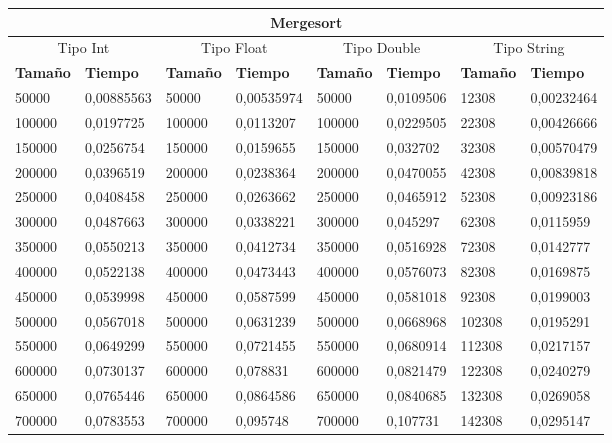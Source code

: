 \documentclass[11pt]{article}
\begin{document}
\begin{table}[!ht]
    \centering
    \small
    \begin{tabular}{|l|l|l|l|l|l|l|l|}
    \hline
    \multicolumn{8}{|c|}{\cellcolor{blue!20}\textbf{Mergesort}} \\ \hline
    \multicolumn{2}{|c|}{\cellcolor{gray!20}Tipo Int} & \multicolumn{2}{c|}{\cellcolor{gray!20}Tipo Float} & \multicolumn{2}{c|}{\cellcolor{gray!20}Tipo Double} & \multicolumn{2}{c|}{\cellcolor{gray!20}Tipo String}\\ \hline
        \textbf{Tamaño} & \textbf{Tiempo} & \textbf{Tamaño} & \textbf{Tiempo} & \textbf{Tamaño} & \textbf{Tiempo} & \textbf{Tamaño} & \textbf{Tiempo} \\ \hline
        50000 & 0,00885563 & 50000 & 0,00535974 & 50000 & 0,0109506 & 12308 & 0,00232464 \\ \hline
        100000 & 0,0197725 & 100000 & 0,0113207 & 100000 & 0,0229505 & 22308 & 0,00426666 \\ \hline
        150000 & 0,0256754 & 150000 & 0,0159655 & 150000 & 0,032702 & 32308 & 0,00570479 \\ \hline
        200000 & 0,0396519 & 200000 & 0,0238364 & 200000 & 0,0470055 & 42308 & 0,00839818 \\ \hline
        250000 & 0,0408458 & 250000 & 0,0263662 & 250000 & 0,0465912 & 52308 & 0,00923186 \\ \hline
        300000 & 0,0487663 & 300000 & 0,0338221 & 300000 & 0,045297 & 62308 & 0,0115959 \\ \hline
        350000 & 0,0550213 & 350000 & 0,0412734 & 350000 & 0,0516928 & 72308 & 0,0142777 \\ \hline
        400000 & 0,0522138 & 400000 & 0,0473443 & 400000 & 0,0576073 & 82308 & 0,0169875 \\ \hline
        450000 & 0,0539998 & 450000 & 0,0587599 & 450000 & 0,0581018 & 92308 & 0,0199003 \\ \hline
        500000 & 0,0567018 & 500000 & 0,0631239 & 500000 & 0,0668968 & 102308 & 0,0195291 \\ \hline
        550000 & 0,0649299 & 550000 & 0,0721455 & 550000 & 0,0680914 & 112308 & 0,0217157 \\ \hline
        600000 & 0,0730137 & 600000 & 0,078831 & 600000 & 0,0821479 & 122308 & 0,0240279 \\ \hline
        650000 & 0,0765446 & 650000 & 0,0864586 & 650000 & 0,0840685 & 132308 & 0,0269058 \\ \hline
        700000 & 0,0783553 & 700000 & 0,095748 & 700000 & 0,107731 & 142308 & 0,0295147 \\ \hline

\end{tabular}
\end{table}
\end{document}
